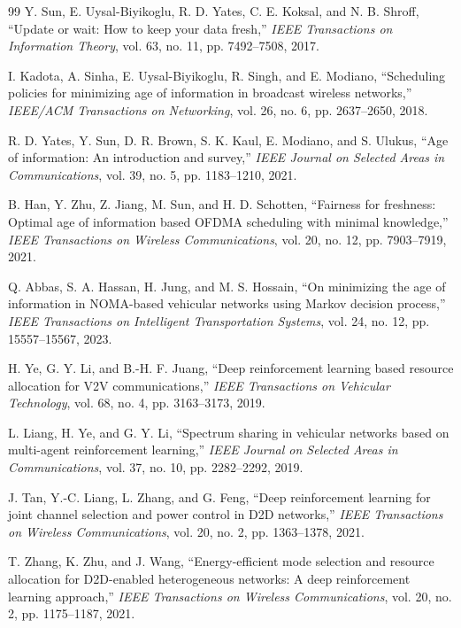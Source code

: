 \documentclass[journal]{IEEEtran}
\begin{document}
\begin{thebibliography}{99}
 Y. Sun, E. Uysal-Biyikoglu, R. D. Yates, C. E. Koksal, and N. B. Shroff, ``Update or wait: How to keep your data fresh,'' \emph{IEEE Transactions on Information Theory}, vol. 63, no. 11, pp. 7492--7508, 2017.

 I. Kadota, A. Sinha, E. Uysal-Biyikoglu, R. Singh, and E. Modiano, ``Scheduling policies for minimizing age of information in broadcast wireless networks,'' \emph{IEEE/ACM Transactions on Networking}, vol. 26, no. 6, pp. 2637--2650, 2018.

 R. D. Yates, Y. Sun, D. R. Brown, S. K. Kaul, E. Modiano, and S. Ulukus, ``Age of information: An introduction and survey,'' \emph{IEEE Journal on Selected Areas in Communications}, vol. 39, no. 5, pp. 1183--1210, 2021.

 B. Han, Y. Zhu, Z. Jiang, M. Sun, and H. D. Schotten, ``Fairness for freshness: Optimal age of information based OFDMA scheduling with minimal knowledge,'' \emph{IEEE Transactions on Wireless Communications}, vol. 20, no. 12, pp. 7903--7919, 2021.

 Q. Abbas, S. A. Hassan, H. Jung, and M. S. Hossain, ``On minimizing the age of information in NOMA-based vehicular networks using Markov decision process,'' \emph{IEEE Transactions on Intelligent Transportation Systems}, vol. 24, no. 12, pp. 15557--15567, 2023.

 H. Ye, G. Y. Li, and B.-H. F. Juang, ``Deep reinforcement learning based resource allocation for V2V communications,'' \emph{IEEE Transactions on Vehicular Technology}, vol. 68, no. 4, pp. 3163--3173, 2019.

 L. Liang, H. Ye, and G. Y. Li, ``Spectrum sharing in vehicular networks based on multi-agent reinforcement learning,'' \emph{IEEE Journal on Selected Areas in Communications}, vol. 37, no. 10, pp. 2282--2292, 2019.

 J. Tan, Y.-C. Liang, L. Zhang, and G. Feng, ``Deep reinforcement learning for joint channel selection and power control in D2D networks,'' \emph{IEEE Transactions on Wireless Communications}, vol. 20, no. 2, pp. 1363--1378, 2021.

 T. Zhang, K. Zhu, and J. Wang, ``Energy-efficient mode selection and resource allocation for D2D-enabled heterogeneous networks: A deep reinforcement learning approach,'' \emph{IEEE Transactions on Wireless Communications}, vol. 20, no. 2, pp. 1175--1187, 2021.


\end{thebibliography}
\end{document}
